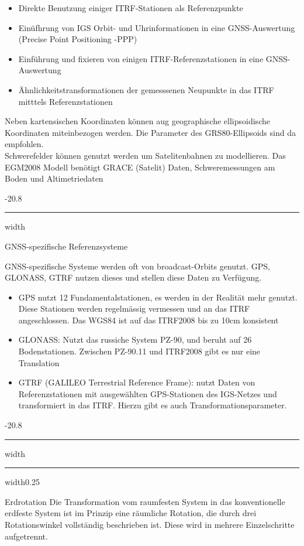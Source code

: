 \documentclass[8pt, landscape, fleqn]{scrartcl}
\makeatletter
\renewcommand{\subsection}{\@startsection{subsection}{1}{0mm}%
{-2\baselineskip}{0.8\baselineskip}%
{\hrule depth 0.2pt width\columnwidth\hrule depth0.75pt
width0.25\columnwidth\vspace*{1.2em}\large\bfseries\rmfamily}}
\renewcommand{\subsubsection}{\@startsection{subsubsection}{1}{0mm}%
{-2\baselineskip}{0.8\baselineskip}%
{\hrule depth 0.2pt width\columnwidth\vspace*{1.2em}\normalsize\bfseries\rmfamily}}
\makeatother
\begin{document}
\begin{multicols*}{3}
\begin{itemize}
    \item Direkte Benutzung einiger ITRF-Stationen als Referenzpunkte
    \item Einüfhrung von IGS Orbit- und Uhrinformationen in eine GNSS-Auswertung (Precise Point Positioning -PPP)
    \item Einführung und fixieren von einigen ITRF-Referenzstationen in eine GNSS-Auswertung
    \item Ähnlichkeitstransformationen der gemesssenen Neupunkte in das ITRF mitttels Referenzstationen
\end{itemize}

Neben kartensischen Koordinaten können aug geographische ellipsoidische Koordinaten miteinbezogen werden. Die Parameter des GRS80-Ellipsoids sind da empfohlen. \\ 

Schwerefelder können genutzt werden um Satelitenbahnen zu modellieren. Das EGM2008 Modell benötigt GRACE (Satelit) Daten, Schweremessungen am Boden und Altimetriedaten

\subsubsection{GNSS-spezifische Referenzsysteme}

GNSS-spezifische Systeme werden oft von broadcast-Orbits genutzt. GPS, GLONASS, GTRF nutzen dieses und stellen diese Daten zu Verfügung. 

\begin{itemize}
    \item GPS nutzt 12 Fundamentalstationen, es werden in der Realität mehr genutzt. Diese Stationen werden regelmässig vermessen und an das ITRF angeschlossen. Das WGS84 ist auf das ITRF2008 bis zu 10cm konsistent
    \item GLONASS: Nutzt das russiche System PZ-90, und beruht auf 26 Bodenstationen. Zwischen PZ-90.11 und ITRF2008 gibt es nur eine Translation
    \item GTRF (GALILEO Terrestrial Reference Frame): nutzt Daten von Referenzstationen mit ausgewählten GPS-Stationen des IGS-Netzes und transformiert in das ITRF. Hierzu gibt es auch Transformationsparameter.
\end{itemize}

\subsection{Erdrotation}
Die Transformation vom raumfesten System in das konventionelle erdfeste System ist im Prinzip eine räumliche Rotation, die durch drei Rotationswinkel vollständig beschrieben ist. Diese wird in mehrere Einzelschritte aufgetrennt.

\end{multicols*}
\end{document}
